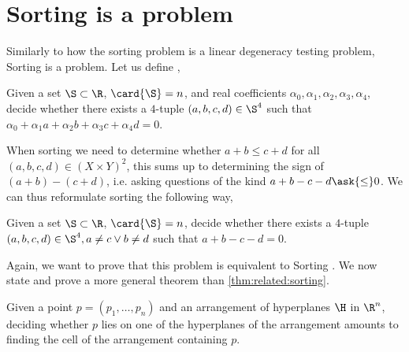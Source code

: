\section{Sorting \XY is a \fourLDT problem}
\label{tree:related:xy4ldt}

Similarly to how the sorting problem is a linear degeneracy testing problem,
Sorting \XY is a \fourLDT problem. Let us define \fourLDT,

\begin{problem}[\fourLDT]
Given a set $\S \subset \R$, $\card{\S} = n$, and real coefficients $\alpha_0,
\alpha_1, \alpha_2, \alpha_3, \alpha_4$, decide whether there exists a
\(4\)-tuple \((a,b,c,d) \in \S^4\) such that
$\alpha_0 + \alpha_1 a + \alpha_2 b + \alpha_3 c + \alpha_4 d = 0$.
\end{problem}

When sorting \XY we need to determine whether $a + b \le c + d$ for all
$(a,b,c,d) \in (X \times Y)^2$, this sums up to determining the sign of $(a+b) -
(c+d)$, i.e. asking questions of the kind $a + b - c - d \ask{\le} 0$. We can thus
reformulate sorting \XY the following way,

\begin{problem}
Given a set $\S \subset \R$, $\card{\S} = n$, decide whether there exists a
\(4\)-tuple \((a,b,c,d) \in \S^4, a \neq c \lor b \neq d\) such
that $a + b - c - d = 0$.
\end{problem}

Again, we want to prove that this problem is equivalent to Sorting \XY. We now
state and prove a more general theorem than \ref{thm:related:sorting}.

\begin{theorem}\label{thm:related:sortingxy}
Given a point \(p = (p_1, \ldots, p_n)\) and an arrangement of hyperplanes
\(\H\) in \(\R^n\), deciding whether \(p\) lies on one of the hyperplanes of the
arrangement amounts to finding the cell of the arrangement containing \(p\).
\end{theorem}

